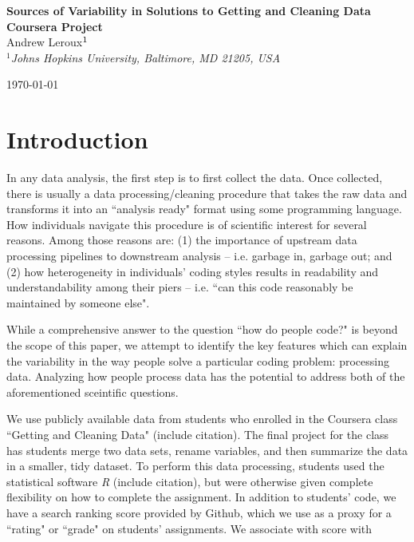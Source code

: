 \documentclass[12pt]{article}\usepackage[]{graphicx}\usepackage[]{color}
\begin{document}



\newif\ifblind
\newif\ifunblind
\unblindtrue

\begin{center}
{\large \bfseries Sources of Variability in Solutions to Getting and Cleaning Data Coursera Project}\\[2ex]
\ifblind Anonymous Authors \else {\normalsize {\sc Andrew Leroux$\null^{1}$}}\\[1ex]
{\it $^{1}$Johns Hopkins University, Baltimore, MD 21205, USA} \\
\vspace{.1in}
\fi
\end{center}

\centerline{\today}


% 
% 

\singlespace





\section{Introduction}

In any data analysis, the first step is to first collect the data. 
Once collected, there is usually a data processing/cleaning procedure 
that takes the raw data and transforms it into an ``analysis ready" format using some programming language. 
How individuals navigate this procedure is of scientific interest for several reasons. 
Among those reasons are: (1) the importance of upstream data processing pipelines to 
downstream analysis -- i.e. garbage in, garbage out; and (2) how heterogeneity in individuals' coding styles 
results in readability and understandability among their piers -- i.e. 
``can this code reasonably be maintained by someone else". 

While a comprehensive answer to the question ``how do people code?" is beyond the scope of this paper, we 
attempt to identify the key features which can explain the variability in the way people solve a particular coding problem: 
processing data. 
Analyzing how people process data has the potential to address both of the aforementioned sceintific questions. 

We use publicly available data from students who enrolled in the Coursera class 
``Getting and Cleaning Data" ({\color{red}include citation}). The final project for the class has students merge two
data sets, rename variables, and then summarize the data in a smaller, tidy dataset. To perform this data processing, 
students used the statistical software {\it R} ({\color{red}include citation}), but were otherwise given complete flexibility on 
how to complete the assignment. 
In addition to students' code, we have a search ranking score provided by Github, which we use as a proxy for 
a ``rating" or ``grade" on students' assignments. We associate with score with 
\end{document}
